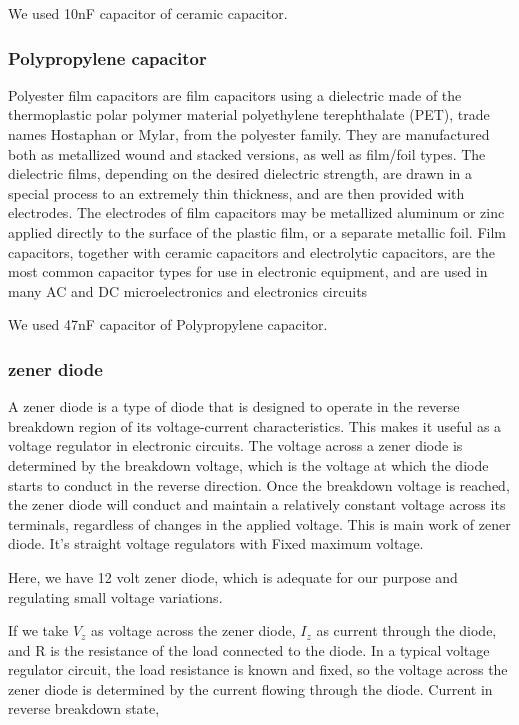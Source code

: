 \documentclass[14pt,a4paper]{extarticle}
\begin{document}
We used 10nF capacitor of ceramic capacitor.
\subsubsection{Polypropylene capacitor}
\label{sec:org50836c9}
Polyester film capacitors are film capacitors using a dielectric made of the thermoplastic polar polymer material polyethylene terephthalate (PET), trade names Hostaphan or Mylar, from the polyester family. They are manufactured both as metallized wound and stacked versions, as well as film/foil types. The dielectric films, depending on the desired dielectric strength, are drawn in a special process to an extremely thin thickness, and are then provided with electrodes. The electrodes of film capacitors may be metallized aluminum or zinc applied directly to the surface of the plastic film, or a separate metallic foil. Film capacitors, together with ceramic capacitors and electrolytic capacitors, are the most common capacitor types for use in electronic equipment, and are used in many AC and DC microelectronics and electronics circuits

We used 47nF capacitor of Polypropylene capacitor.
\subsubsection{zener diode}
\label{sec:org7264be8}

A zener diode is a type of diode that is designed to operate in the reverse breakdown region of its voltage-current characteristics. This makes it useful as a voltage regulator in electronic circuits. The voltage across a zener diode is determined by the breakdown voltage, which is the voltage at which the diode starts to conduct in the reverse direction. Once the breakdown voltage is reached, the zener diode will conduct and maintain a relatively constant voltage across its terminals, regardless of changes in the applied voltage. This is main work of zener diode. It's straight voltage regulators with Fixed maximum voltage.

Here, we have 12 volt zener diode, which is adequate for our purpose and regulating small voltage variations.

If we take \(V_z\) as voltage across the zener diode, \(I_z\) as current through the diode, and R is the resistance of the load connected to the diode. In a typical voltage regulator circuit, the load resistance is known and fixed, so the voltage across the zener diode is determined by the current flowing through the diode. Current in reverse breakdown state,
\end{document}
